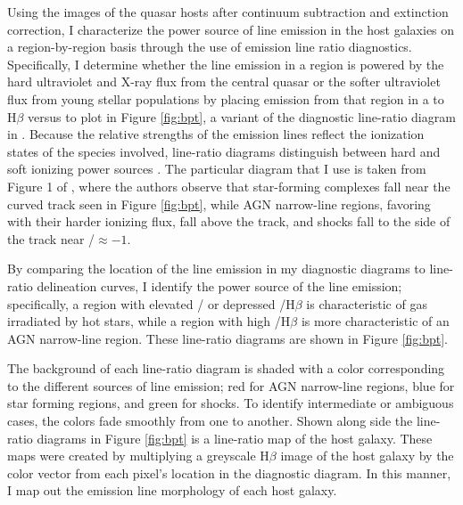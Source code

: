 Using the images of the quasar hosts after continuum subtraction and extinction correction, I characterize the power source of line emission in the host galaxies on a region-by-region basis through the use of emission line ratio diagnostics. Specifically, I determine whether the line emission in a region is powered by the hard ultraviolet and X-ray flux from the central quasar or the softer ultraviolet flux from young stellar populations \citep{BPT,Netzer2004,Osterbrock} by placing emission from that region in a  to H$\beta$ versus  to  plot in Figure \ref{fig:bpt}, a variant of the diagnostic line-ratio diagram in \cite{BPT}. Because the relative strengths of the emission lines reflect the ionization states of the species involved, line-ratio diagrams distinguish between hard and soft ionizing power sources \citep{KewleyBPT,KauffmannBPT}. The particular diagram that I use is taken from Figure 1 of \cite{BPT}, where the authors observe that star-forming complexes fall near the curved track seen in Figure \ref{fig:bpt}, while AGN narrow-line regions, favoring  with their harder ionizing flux, fall above the track, and shocks fall to the side of the track near /$ \approx -1$.

By comparing the location of the line emission in my diagnostic diagrams to line-ratio delineation curves, I identify the power source of the line emission; specifically, a region with elevated / or depressed /H$\beta$ is characteristic of gas irradiated by hot stars, while a region with high /H$\beta$ is more characteristic of an AGN narrow-line region. These line-ratio diagrams are shown in Figure \ref{fig:bpt}.

The background of each line-ratio diagram is shaded with a color corresponding to the different sources of line emission; red for AGN narrow-line regions, blue for star forming regions, and green for shocks. To identify intermediate or ambiguous cases, the colors fade smoothly from one to another. Shown along side the line-ratio diagrams in Figure \ref{fig:bpt} is a line-ratio map of the host galaxy.  These maps were created by multiplying a greyscale H$\beta$ image of the host galaxy by the color vector from each pixel's location in the diagnostic diagram. In this manner, I map out the emission line morphology of each host galaxy.

